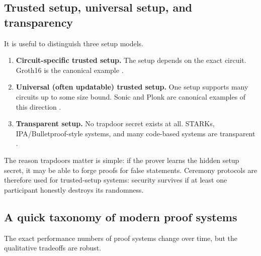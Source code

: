 \subsection{Trusted setup, universal setup, and transparency}

It is useful to distinguish three setup models.

\begin{enumerate}[leftmargin=2em]
    \item \textbf{Circuit-specific trusted setup.} The setup depends on the exact circuit. Groth16 is the canonical example \cite{Groth2016}.
    \item \textbf{Universal (often updatable) trusted setup.} One setup supports many circuits up to some size bound. Sonic and Plonk are canonical examples of this direction \cite{MallerBoweKohlweissMeiklejohn2019,GabizonWilliamsonCiobotaru2019}.
    \item \textbf{Transparent setup.} No trapdoor secret exists at all. STARKs, IPA/Bulletproof-style systems, and many code-based systems are transparent \cite{Bulletproofs2018,BenSassonBentovHoreshRiabzev2018STARK}.
\end{enumerate}

The reason trapdoors matter is simple: if the prover learns the hidden setup secret, it may be able to forge proofs for false statements. Ceremony protocols are therefore used for trusted-setup systems: security survives if at least one participant honestly destroys its randomness.

\subsection{A quick taxonomy of modern proof systems}

The exact performance numbers of proof systems change over time, but the qualitative tradeoffs are robust.

